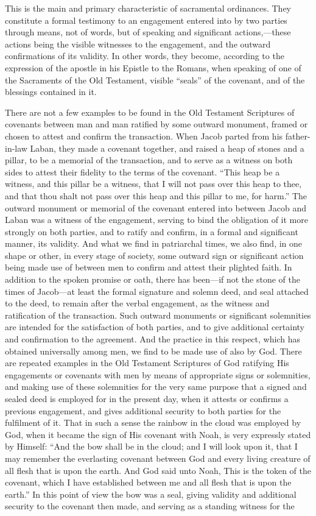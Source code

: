 \documentclass[]{book}
\begin{document}
This is the main and primary characteristic of sacramental ordinances. They constitute a formal testimony to an engagement entered into by two parties through means, not of words, but of speaking and significant actions,---these actions being the visible witnesses to the engagement, and the outward confirmations of its validity. In other words, they become, according to the expression of the apostle in his Epistle to the Romans, when speaking of one of the Sacraments of the Old Testament, visible ``seals'' of the covenant, and of the blessings contained in it.

There are not a few examples to be found in the Old Testament Scriptures of covenants between man and man ratified by some outward monument, framed or chosen to attest and confirm the transaction. When Jacob parted from his father-in-law Laban, they made a covenant together, and raised a heap of stones and a pillar, to be a memorial of the transaction, and to serve as a witness on both sides to attest their fidelity to the terms of the covenant. ``This heap be a witness, and this pillar be a witness, that I will not pass over this heap to thee, and that thou shalt not pass over this heap and this pillar to me, for harm.'' The outward monument or memorial of the covenant entered into between Jacob and Laban was a witness of the engagement, serving to bind the obligation of it more strongly on both parties, and to ratify and confirm, in a formal and significant manner, its validity. And what we find in patriarchal times, we also find, in one shape or other, in every stage of society, some outward sign or significant action being made use of between men to confirm and attest their plighted faith. In addition to the spoken promise or oath, there has been---if not the stone of the times of Jacob---at least the formal signature and solemn deed, and seal attached to the deed, to remain after the verbal engagement, as the witness and ratification of the transaction. Such outward monuments or significant solemnities are intended for the satisfaction of both parties, and to give additional certainty and confirmation to the agreement. And the practice in this respect, which has obtained universally among men, we find to be made use of also by God. There are repeated examples in the Old Testament Scriptures of God ratifying His engagements or covenants with men by means of appropriate signs or solemnities, and making use of these solemnities for the very same purpose that a signed and sealed deed is employed for in the present day, when it attests or confirms a previous engagement, and gives additional security to both parties for the fulfilment of it. That in such a sense the rainbow in the cloud was employed by God, when it became the sign of His covenant with Noah, is very expressly stated by Himself: ``And the bow shall be in the cloud; and I will look upon it, that I may remember the everlasting covenant between God and every living creature of all flesh that is upon the earth. And God said unto Noah, This is the token of the covenant, which I have established between me and all flesh that is upon the earth.'' In this point of view the bow was a seal, giving validity and additional security to the covenant then made, and serving as a standing witness for the 
\end{document}
